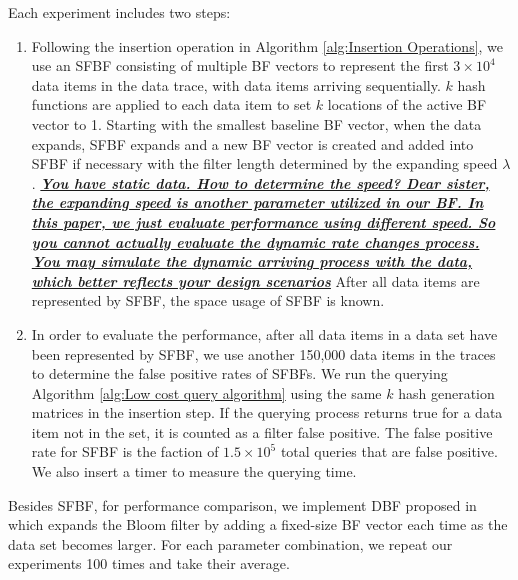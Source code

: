 \documentclass[10pt,journal,letterpaper]{IEEEtran}
\newcommand{\note}[1]{{\sffamily\itshape\bfseries\uline{#1}}}
\begin{document}
Each experiment includes two steps:
\begin{enumerate}

\item Following the insertion operation in Algorithm \ref{alg:Insertion Operations}, we use an SFBF consisting of multiple BF vectors to represent the first $3 \times 10^4$ data items in the data trace, with data items  arriving sequentially.  $k$ hash functions are applied to each data item to set $k$ locations of the active BF vector to 1. Starting with the smallest baseline BF vector, when the data expands, SFBF expands and a new BF vector is created and added into SFBF if necessary with the filter length determined by the expanding speed $\lambda$. \note{You have static data. How to determine the speed? Dear sister, the expanding speed is another parameter utilized in our BF. In this paper, we just evaluate performance using different speed. So you cannot actually evaluate the dynamic rate changes process. You may simulate the dynamic arriving process with the data, which better reflects your design scenarios} After all data items are represented by SFBF, the space usage of SFBF is known.

\item In order to evaluate the performance, after all data items in a data set have been represented by SFBF, we use another 150,000 data items in the traces to determine the false positive rates of SFBFs.  We run the querying Algorithm \ref{alg:Low cost query algorithm} using the same $k$ hash generation matrices in the insertion step. If the querying process returns true for a data item not in the set, it is counted as a filter false positive. The false positive rate for SFBF is the faction of $1.5 \times 10^5$ total queries that are false positive. We also insert a timer to measure the querying time.
\end{enumerate}



Besides SFBF, for performance comparison, we implement DBF proposed in~\cite{guo2006theory} which expands
the Bloom filter by adding a fixed-size BF vector each time as the data set becomes larger.  For each parameter combination, we repeat our experiments 100 times and take their average.
\end{document}
